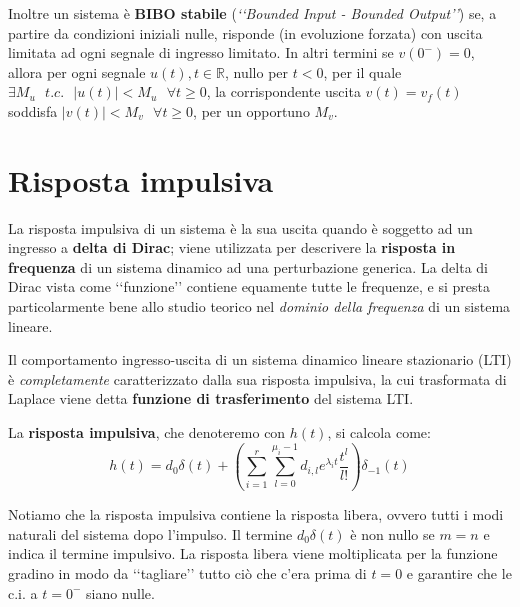 \documentclass[a4paper, titlepage, oneside]{scrbook}
\begin{document}
Inoltre un sistema è \textbf{BIBO stabile} (\textit{‘‘Bounded Input - Bounded Output’’}) se, a partire da condizioni iniziali nulle, risponde (in evoluzione forzata)
con uscita limitata ad ogni segnale di ingresso limitato. In altri termini se $v(0^-)=0$, allora per ogni segnale $u(t), t\in \mathbb{R}$, nullo per $t<0$, per il quale
$\exists M_u \text{ } t.c. \text{ } |u(t)| < M_u \text{ } \forall t \geq 0$, la corrispondente uscita $v(t)=v_f(t)$ soddisfa $|v(t)|<M_v \text{ } \forall t \geq 0$, per un opportuno $M_v$.

\section{Risposta impulsiva}
La risposta impulsiva di un sistema è la sua uscita quando è soggetto ad un ingresso a \textbf{delta di Dirac};
viene utilizzata per descrivere la \textbf{risposta in frequenza} di un sistema dinamico ad una perturbazione generica.
La delta di Dirac vista come ‘‘funzione’’ contiene equamente tutte le frequenze, e si presta particolarmente bene allo studio teorico nel \textit{dominio della frequenza} di un sistema lineare.

Il comportamento ingresso-uscita di un sistema dinamico lineare stazionario (LTI) è \textit{completamente} caratterizzato dalla sua risposta impulsiva, la cui trasformata di Laplace viene detta \textbf{funzione di trasferimento} del sistema LTI.

La \textbf{risposta impulsiva}, che denoteremo con $h(t)$, si calcola come:
\begin{equation}
h(t)=d_0\delta(t)+\left(\sum_{i=1}^{r} \sum_{l=0}^{\mu_i-1} d_{i,l}e^{\lambda_it}\frac{t^l}{l!}\right)\delta_{-1}(t)
\label{eqn:risposta_impulsiva}
\end{equation}

Notiamo che la risposta impulsiva contiene la risposta libera, ovvero tutti i modi naturali del sistema dopo l'impulso. Il termine $d_0\delta(t)$ è non nullo se $m=n$ e indica il termine impulsivo.
La risposta libera viene moltiplicata per la funzione gradino in modo da ‘‘tagliare’’ tutto ciò che c'era prima di $t=0$ e garantire che le c.i. a $t=0^-$ siano nulle.
\end{document}
